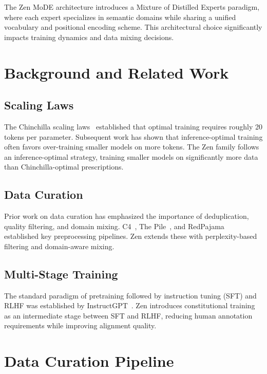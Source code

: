 \documentclass[11pt,a4paper]{article}
\begin{document}
The Zen MoDE architecture introduces a Mixture of Distilled Experts paradigm, where
each expert specializes in semantic domains while sharing a unified vocabulary and
positional encoding scheme. This architectural choice significantly impacts training
dynamics and data mixing decisions.

\section{Background and Related Work}

\subsection{Scaling Laws}

The Chinchilla scaling laws~\cite{hoffmann2022chinchilla} established that optimal
training requires roughly 20 tokens per parameter. Subsequent work has shown that
inference-optimal training often favors over-training smaller models on more tokens.
The Zen family follows an inference-optimal strategy, training smaller models on
significantly more data than Chinchilla-optimal prescriptions.

\subsection{Data Curation}

Prior work on data curation has emphasized the importance of deduplication, quality
filtering, and domain mixing. C4~\cite{raffel2020c4}, The Pile~\cite{gao2021pile}, and
RedPajama~\cite{together2023redpajama} established key preprocessing pipelines. Zen
extends these with perplexity-based filtering and domain-aware mixing.

\subsection{Multi-Stage Training}

The standard paradigm of pretraining followed by instruction tuning (SFT) and RLHF
was established by InstructGPT~\cite{ouyang2022rlhf}. Zen introduces constitutional
training as an intermediate stage between SFT and RLHF, reducing human annotation
requirements while improving alignment quality.

\section{Data Curation Pipeline}
\end{document}
